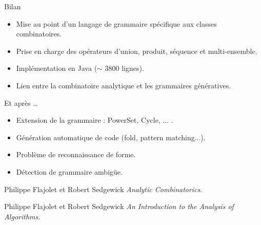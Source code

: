 \documentclass{beamer}
\begin{document}
\begin{frame}{Bilan}
\begin{itemize}
\item Mise au point d'un langage de grammaire spécifique aux classes combinatoires.
\item Prise en charge des opérateurs d'union, produit, séquence et multi-ensemble.
\item Implémentation en Java ($\sim$ 3800 lignes). \\
  \footnotesize{}
\normalsize
\item Lien entre la combinatoire analytique et les grammaires génératives.
\end{itemize}
\end{frame}



\begin{frame}{Et après \ldots}
\begin{itemize}
\item Extension de la grammaire : PowerSet, Cycle, ... .
\item Génération automatique de code (fold, pattern matching...).
\item Problème de reconnaissance de forme.
\item Détection de grammaire ambigüe.
\end{itemize}
\begin{thebibliography}{9}
    Philippe Flajolet et Robert Sedgewick
    \emph{ Analytic Combinatorics}.

    Philippe Flajolet et Robert Sedgewick
    \emph{An Introduction to the Analysis of Algorithms}.

  \end{thebibliography}
\end{frame}
\end{document}
